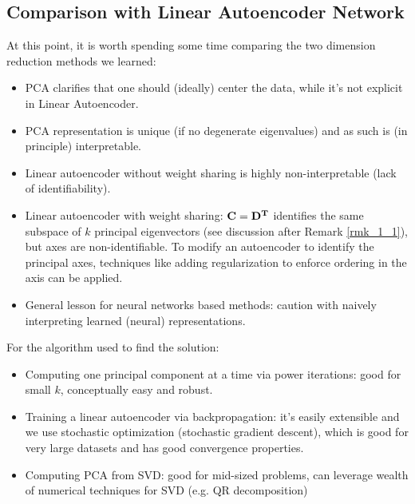 \documentclass[../book-template.tex]{subfiles}
\begin{document}
\subsection{Comparison with Linear Autoencoder Network}
At this point, it is worth spending some time comparing the two dimension reduction methods we learned:
\begin{itemize}
    \item PCA clarifies that one should (ideally) center the data, while it's not explicit in Linear Autoencoder.
    \item PCA representation is unique (if no degenerate eigenvalues) and as such is (in principle) interpretable.
    \item Linear autoencoder without weight sharing is highly non-interpretable (lack of identifiability).
    \item Linear autoencoder with weight sharing: ${\bf C=D^T}$ identifies the same subspace of $k$ principal eigenvectors (see discussion after Remark \ref{rmk_1_1}), but axes are non-identifiable. To modify an autoencoder to identify the principal axes, techniques like adding regularization to enforce ordering in the axis can be applied.
    \item General lesson for neural networks based methods: caution with naively interpreting learned (neural) representations.
\end{itemize}
\par For the algorithm used to find the solution:
\begin{itemize}
    \item Computing one principal component at a time via power iterations: good for small $k$, conceptually easy and robust.
    \item Training a linear autoencoder via backpropagation: it's easily extensible and we use stochastic optimization (stochastic gradient descent), which is good for very large datasets and has good convergence properties.
    \item Computing PCA from SVD: good for mid-sized problems, can leverage wealth of numerical techniques for SVD (e.g. QR decomposition)
\end{itemize}
\end{document}
